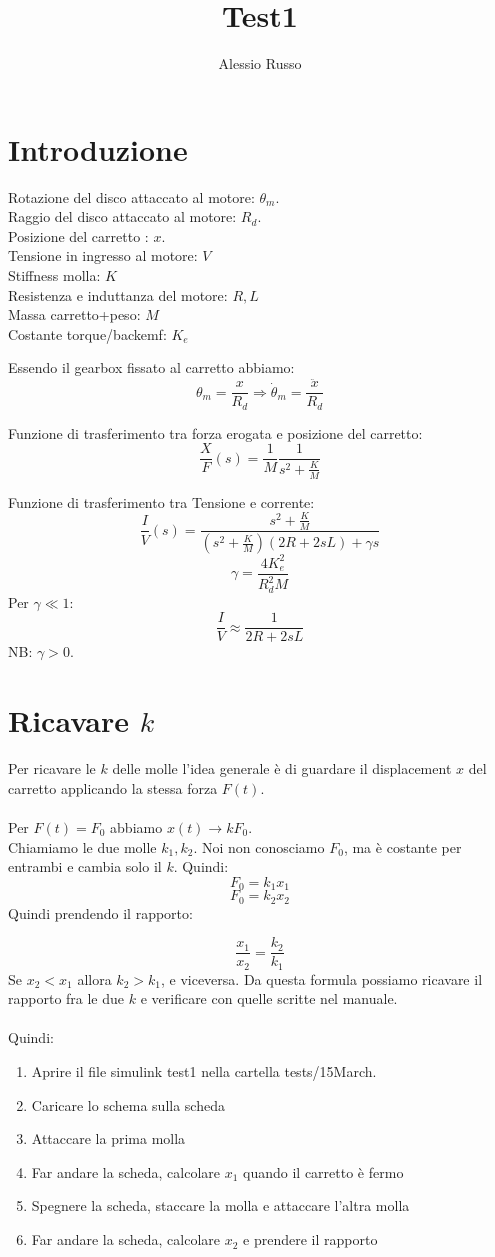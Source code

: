 \documentclass[10pt,a4paper]{article}
\author{Alessio Russo}
\title{Test1}
\begin{document}
\tableofcontents

\section{Introduzione}
Rotazione del disco attaccato al motore: $\theta_m$. \\
Raggio del disco attaccato al motore: $R_d$. \\
Posizione del carretto : $x$. \\
Tensione in ingresso al motore: $V$ \\
Stiffness molla: $K$ \\
Resistenza e induttanza del motore: $R,L$ \\
Massa carretto+peso: $M$ \\
Costante torque/backemf: $K_e$

Essendo il gearbox fissato al carretto abbiamo:
$$\theta_m = \frac{x}{R_d} \Rightarrow \dot{\theta}_m = \frac{\ddot{x}}{R_d}$$

Funzione di trasferimento tra forza erogata e posizione del carretto:
$$\frac{X}{F}(s) = \frac{1}{M} \frac{1}{s^2+\frac{K}{M}}$$

Funzione di trasferimento tra Tensione e corrente:
$$\frac{I}{V}(s) = \frac{s^2+\frac{K}{M}}{(s^2+\frac{K}{M})(2R+2sL)+\gamma s}$$
$$\gamma = \frac{4K_e^2}{R_d^2M}$$
Per $\gamma \ll 1$:
$$\frac{I}{V} \approx \frac{1}{2R+2sL}$$
NB: $\gamma > 0$.
\newpage
\section{Ricavare $k$}
Per ricavare le $k$ delle molle l'idea generale è di guardare il displacement $x$ del carretto applicando la stessa forza $F(t)$. \\ \\
Per $F(t)=F_0$ abbiamo $x(t) \to kF_0$. \\
Chiamiamo le due molle $k_1,k_2$. Noi non conosciamo $F_0$, ma è costante per entrambi e cambia solo il $k$. Quindi:
$$F_0 = k_1 x_1$$
$$F_0 = k_2 x_2$$
Quindi prendendo il rapporto:

$$\frac{x_1}{x_2} = \frac{k_2}{k_1}$$
Se $x_2 < x_1$ allora $k_2 > k_1$, e viceversa.  Da questa formula possiamo ricavare il rapporto fra le due $k$ e verificare con quelle scritte nel manuale. \\ \\
Quindi:
\begin{enumerate}
\item Aprire il file simulink test1 nella cartella tests/15March.
\item Caricare lo schema sulla scheda
\item Attaccare la prima molla
\item Far andare la scheda, calcolare $x_1$ quando il carretto è fermo
\item Spegnere la scheda, staccare la molla e attaccare l'altra molla
\item Far andare la scheda, calcolare $x_2$ e prendere il rapporto
\end{enumerate}
\newpage
\end{document}
